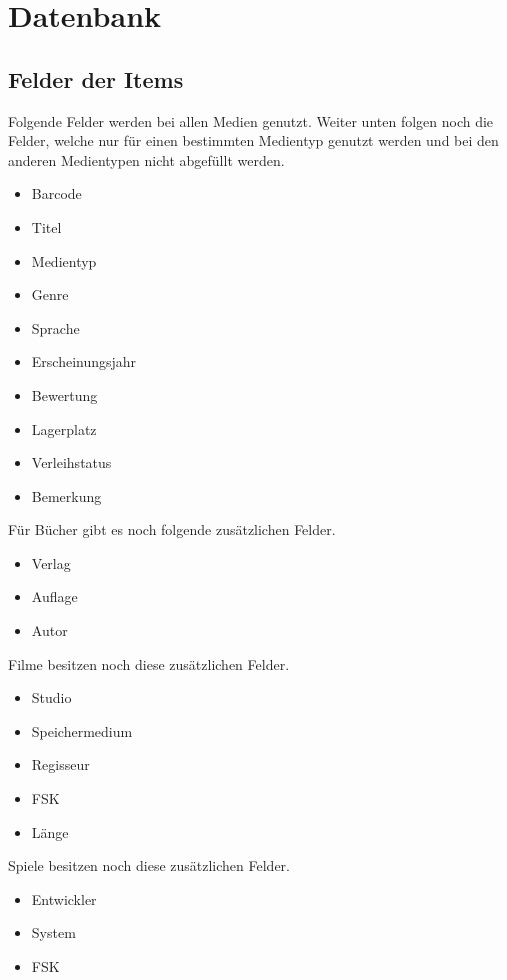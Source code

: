 \section{Datenbank}

\subsection{Felder der Items}
\label{sec:Felder}

Folgende Felder werden bei allen Medien genutzt. Weiter unten folgen noch die Felder, welche nur für einen bestimmten Medientyp genutzt werden und bei den anderen Medientypen nicht abgefüllt werden.

\begin{itemize}
	\item Barcode
	\item Titel
	\item Medientyp
	\item Genre
	\item Sprache
	\item Erscheinungsjahr
	\item Bewertung
	\item Lagerplatz
	\item Verleihstatus
	\item Bemerkung
\end{itemize}

Für Bücher gibt es noch folgende zusätzlichen Felder.

\begin{itemize}
	\item Verlag
	\item Auflage
	\item Autor
\end{itemize}

Filme besitzen noch diese zusätzlichen Felder.

\begin{itemize}
	\item Studio
	\item Speichermedium
	\item Regisseur
	\item FSK
	\item Länge
\end{itemize}

Spiele besitzen noch diese zusätzlichen Felder.

\begin{itemize}
	\item Entwickler
	\item System
	\item FSK
\end{itemize}